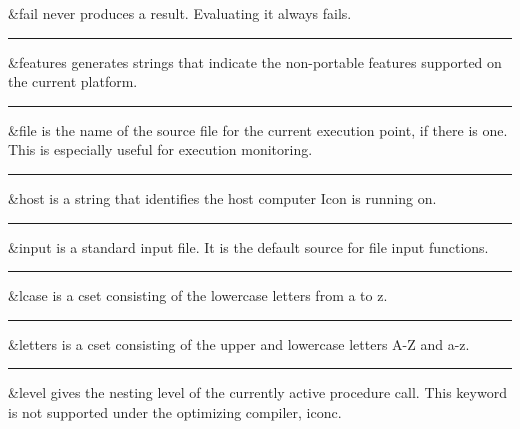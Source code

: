 \noindent
{}\textsf{\&fail} never produces a
result. Evaluating it always fails.

\bigskip\hrule\vspace{0.1cm}

\noindent
{}\textsf{\&features} generates strings that indicate the
non-portable features supported on the current platform.

\bigskip\hrule\vspace{0.1cm}

\noindent
\textsf{\&file} is the name of the source file for
the current execution point, if there is one. This is especially useful
for execution monitoring.

\bigskip\hrule\vspace{0.1cm}

\noindent
{}\textsf{\&host} is a string that
identifies the host computer Icon is running on.

\bigskip\hrule\vspace{0.1cm}

\noindent
{}\textsf{\&input} is a standard input
file. It is the default source for file input functions.

\bigskip\hrule\vspace{0.1cm}

\noindent
{}\textsf{\&lcase} is a cset consisting of
the lowercase letters from a to z.

\bigskip\hrule\vspace{0.1cm}

\noindent
{}\textsf{\&letters} is a cset consisting
of the upper and lowercase letters A-Z and a-z.

\bigskip\hrule\vspace{0.1cm}

\noindent
{}\textsf{\&level} gives the nesting level of the
currently active procedure call. This keyword is not supported under
the optimizing compiler, iconc.

